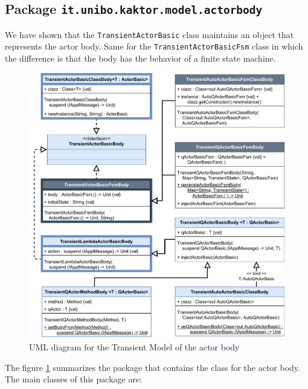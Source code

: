 \subsection{Package \texttt{it.unibo.kaktor.model.actorbody}}

We have shown that the \texttt{TransientActorBasic} class maintains an object that represents the actor body. Same for the \texttt{TransientActorBasicFsm} class in which the difference is that the body has the behavior of a finite state machine.

\begin{figure}[h]
	\centering
	\includegraphics[width=\textwidth]{img/[UML]it.unibo.kaktor.model.actorbody_onlyactorbody}
	\caption{UML diagram for the Transient Model of the actor body}
	\label{fig::uml_model_body}
\end{figure}

The figure \ref{fig::uml_model_body} summarizes the package that contains the class for the actor body. The main classes of this package are:

